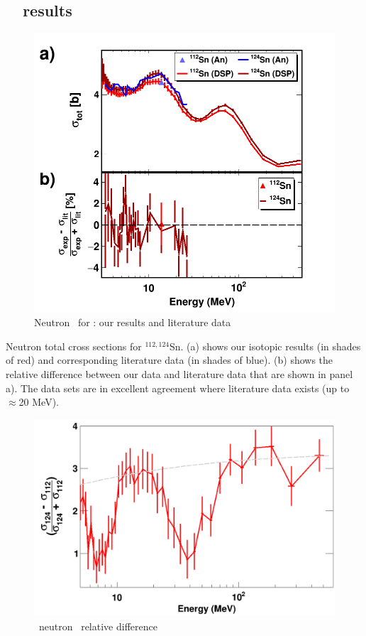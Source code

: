         \cite{Poenitz1983}

\subsection{\snTwelveFour\ \tot\ results}
\begin{figure}
    \includegraphics[scale=0.35]{figures/TwoPanelSn.png}
    \caption{Neutron \tot\ for \snTwelveFour: our results and literature data}
    \label{TwoPanelSn}
\end{figure}

Neutron total cross sections for $^{112,124}$Sn.
        (a) shows our isotopic results (in shades of red) and
        corresponding literature data \cite{Harper1982, Timokhov1989, Rapaport1980, Dukarevich1967} (in
        shades of blue). (b) shows the relative difference between our data
        and literature data that are shown in panel a). The data sets are in
    excellent agreement where literature data exists (up to $\approx$20 MeV).

\begin{figure}
    \includegraphics[scale=0.35]{figures/relativeDiff_Sn124Sn112.png}
    \caption{\snTwelveFour\ neutron \tot\ relative difference}
    \label{IsotopicDifferenceSn}
\end{figure}

\afterpage{\clearpage}
